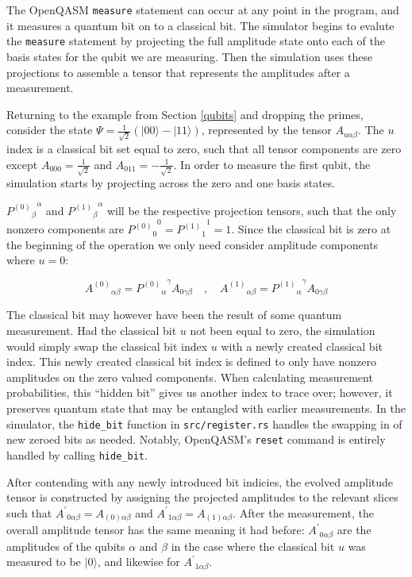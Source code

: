 \documentclass[%
 reprint,
 amsmath,amssymb,
 aps,
]{revtex4-2}
\begin{document}
The OpenQASM \texttt{measure} statement can occur at any point in the program, and it measures a quantum bit on to a classical bit. The simulator begins to evalute the \texttt{measure} statement by projecting the full amplitude state onto each of the basis states for the qubit we are measuring. Then the simulation uses these projections to assemble a tensor that represents the amplitudes after a measurement.

Returning to the example from Section \ref{qubits} and dropping the primes, consider the state $\Psi = \frac{1}{\sqrt{2}} (|00\rangle - |11\rangle)$, represented by the tensor $A_{u \alpha\beta }$. The $u$ index is a classical bit set equal to zero, such that all tensor components are zero except $A_{000} = \frac{1}{\sqrt{2}}$ and $A_{011} = -\frac{1}{\sqrt{2}}$. In order to measure the first qubit, the simulation starts by projecting across the zero and one basis states. 

${{P^{(0)}}_{\beta}}^{\alpha}$ and ${{P^{(1)}}_{\beta}}^{\alpha}$ will be the respective projection tensors, such that the only nonzero components are ${{P^{(0)}}_{0}}^0 = {{P^{(1)}}_{1}}^1 = 1$. Since the classical bit is zero at the beginning of the operation we only need consider amplitude components where $u=0$:

$$ {A^{(0)}}_{\alpha\beta}  ={{P^{(0)}}_{\alpha}}^{\gamma} A_{0 \gamma\beta} \quad , \quad {A^{(1)}}_{\alpha\beta}  ={{P^{(1)}}_{\alpha}}^{\gamma} A_{0 \gamma\beta} $$

The classical bit may however have been the result of some quantum measurement. Had the classical bit $u$ not been equal to zero, the simulation would simply swap the classical bit index $u$ with a newly created classical bit index. This newly created classical bit index is defined to only have nonzero amplitudes on the zero valued components. When calculating measurement probabilities, this ``hidden bit'' gives us another index to trace over; however, it preserves quantum state that may be entangled with earlier measurements. In the simulator, the \texttt{hide\_bit} function in \texttt{src/register.rs} handles the swapping in of new zeroed bits as needed. Notably, OpenQASM's \texttt{reset} command is entirely handled by calling \texttt{hide\_bit}.

After contending with any newly introduced bit indicies, the evolved amplitude tensor is constructed by assigning the projected amplitudes to the relevant slices such that ${A^\prime}_{0\alpha\beta} = A_{(0)\alpha\beta}$ and ${A^\prime}_{1\alpha\beta} = A_{(1)\alpha\beta}$. After the measurement, the overall amplitude tensor has the same meaning it had before: ${A^\prime}_{0 \alpha\beta}$ are the amplitudes of the qubits $\alpha$ and $\beta$ in the case where the classical bit $u$ was measured to be $|0\rangle$, and likewise for ${A^\prime}_{1 \alpha\beta}$.
\end{document}

